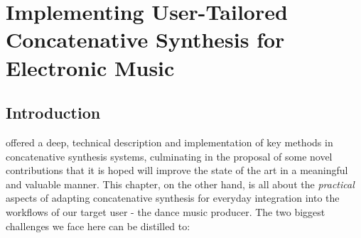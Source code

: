 \chapter{Implementing User-Tailored Concatenative Synthesis for Electronic Music}
\label{chap:rhythmcat}

%
%
%
%
%
%
%

\section{Introduction}

 offered a deep, technical description and implementation of key methods in concatenative synthesis systems, culminating in the proposal of some novel contributions that it is hoped will improve the state of the art in a meaningful and valuable manner. This chapter, on the other hand, is all about the \textit{practical} aspects of adapting concatenative synthesis for everyday integration into the workflows of our target user - the dance music producer. The two biggest challenges we face here can be distilled to:

